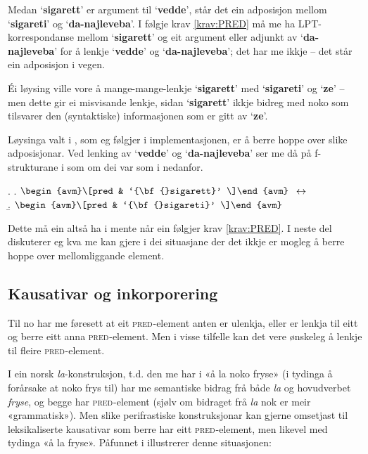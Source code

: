 \documentclass[12pt,a4paper,oneside,draft]{report}
\newcommand{\F}[2]{\textsc{#1}\ensuremath{_{#2}}}
\newcommand{\PRED}{\F{pred}{}}
\newcommand{\p}[1]{`\textbf{#1}'}
\begin{document}
 Medan \p{sigarett} er argument til \p{vedde}, står det ein adposisjon
 mellom \p{sigareti} og \p{da-najleveba}. I følgje krav
 \ref{krav:PRED} må me ha LPT\hyp{}korrespondanse mellom \p{sigarett} og
 eit argument eller adjunkt av \p{da-najleveba} for å lenkje \p{vedde} og
 \p{da-najleveba}; det har me ikkje -- det står ein adposisjon i vegen.

 Éi løysing ville vore å mange-mange-lenkje \p{sigarett} med
 \p{sigareti} og \p{ze} -- men dette gir ei misvisande lenkje, sidan
 \p{sigarett} ikkje bidreg med noko som tilsvarer den (syntaktiske)
 informasjonen som er gitt av \p{ze}. 

 Løysinga valt i \citet[s.~75,~fotnote~3]{dyvik2009lmp}, som eg
 følgjer i implementasjonen, er å berre hoppe over slike
 adposisjonar. Ved lenking av \p{vedde} og \p{da-najleveba} ser me
 då på f\hyp{}strukturane i \Last som om dei var som i \Next nedanfor.

{\avmoptions{}
\ex. \a. $\begin{avm}\[pred & `{\bf{}sigarett}' \]\end{avm}\\$
     $\\\leftrightarrow$\\
     \b.     $\begin{avm}\[pred & `{\bf{}sigareti}' \]\end{avm}$

}

 Dette må ein altså ha i mente når ein følgjer krav \ref{krav:PRED}. I
 neste del diskuterer eg kva me kan gjere i dei situasjane der det
 ikkje er mogleg å berre hoppe over mellomliggande element.

\subsection{Kausativar og inkorporering}
\label{sec-3.6.5}

\label{SEC:f-mange-mange}

Til no har me føresett at eit \PRED{}-element anten er ulenkja, eller
er lenkja til eitt og berre eitt anna \PRED{}-element. Men i visse
tilfelle kan det vere ønskeleg å lenkje til fleire \PRED{}-element.

I ein norsk \emph{la}-konstruksjon, t.d. den me har i «å la noko fryse» (i
tydinga å forårsake at noko frys til) har me semantiske bidrag frå
både \emph{la} og hovudverbet \emph{fryse}, og begge har \PRED{}-element (sjølv om
bidraget frå \emph{la} nok er meir «grammatisk»). Men slike perifrastiske
konstruksjonar kan gjerne omsetjast til leksikaliserte kausativar som
berre har eitt \PRED{}-element, men likevel med tydinga «å la
fryse». Påfunnet i \Next illustrerer denne situasjonen:
\end{document}
